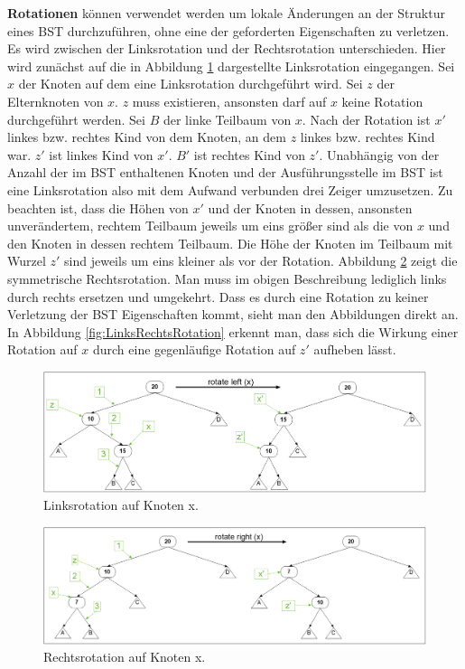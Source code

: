 \documentclass[a4paper,12pt]{article}
\begin{document}
\noindent\textbf{Rotationen} können verwendet werden um lokale Änderungen an der Struktur eines BST durchzuführen, ohne eine der geforderten Eigenschaften zu verletzen. Es wird zwischen der Linksrotation und der Rechtsrotation 
unterschieden. Hier wird zunächst auf die in Abbildung \ref{fig:Linksrotation} dargestellte Linksrotation eingegangen. 
Sei $x$ der Knoten auf dem eine Linksrotation durchgeführt wird. Sei $z$ der Elternknoten von $x$. $z$ muss existieren, ansonsten darf auf $x$ keine Rotation durchgeführt werden. Sei $B$ der linke Teilbaum von $x$. Nach der Rotation ist $x'$ linkes bzw. rechtes Kind von dem Knoten, an dem $z$ linkes bzw. rechtes Kind war. $z'$ ist linkes Kind von $x'$. $B '$ ist rechtes Kind von $z'$. Unabhängig von der Anzahl der im BST enthaltenen Knoten und der Ausführungsstelle im BST ist eine Linksrotation also mit dem Aufwand verbunden drei Zeiger umzusetzen. Zu beachten ist, dass die Höhen von $x'$ und der Knoten in dessen, ansonsten unverändertem, rechtem Teilbaum jeweils um eins größer sind als die von $x$ und den Knoten in dessen rechtem Teilbaum. Die Höhe der Knoten im Teilbaum mit Wurzel $z'$ sind jeweils um eins kleiner als vor der Rotation.
Abbildung \ref{fig:Rechtsrotation} zeigt die symmetrische Rechtsrotation. Man muss im obigen Beschreibung lediglich links durch rechts ersetzen und umgekehrt. Dass es durch eine Rotation zu keiner Verletzung der BST Eigenschaften kommt, sieht man den Abbildungen direkt an. In Abbildung \ref{fig:LinksRechtsRotation} erkennt man, dass sich die Wirkung einer Rotation auf $x$ durch eine gegenläufige Rotation auf $z'$ aufheben lässt.  
\begin{figure}[h]
	\centering
	\includegraphics[width= 1.2\textwidth]{"Medien/Einleitung/Linksrotation"}
	\caption{Linksrotation auf Knoten x. }
	\label{fig:Linksrotation}
\end{figure}
\begin{figure}[h]
	\centering
	\includegraphics[width= 1.2\textwidth]{"Medien/Einleitung/Rechtsrotation"}
	\caption{Rechtsrotation auf Knoten x. }
	\label{fig:Rechtsrotation}
\end{figure}
\end{document}
